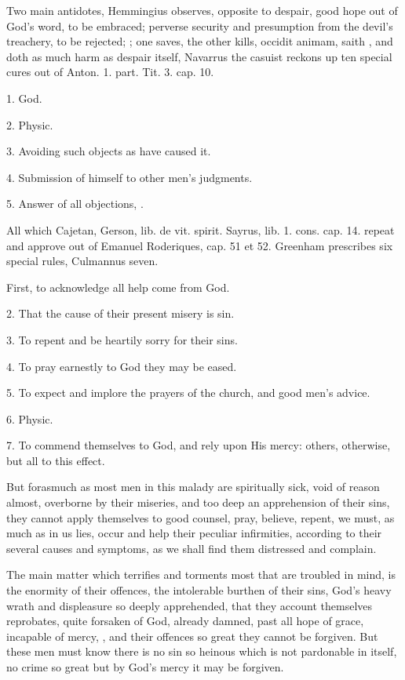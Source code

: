 {Two main antidotes, Hemmingius observes, opposite to despair,
good hope out of God's word, to be embraced; perverse security and
presumption from the devil's treachery, to be rejected; ; one saves, the other kills, occidit animam, saith
\Austin{}, and doth as much harm as despair itself, Navarrus the
casuist reckons up ten special cures out of Anton. \textlatin{1. part. Tit. 3.
cap. 10.}

1. God.

2. Physic.

3. Avoiding such objects as have
caused it.

4. Submission of himself to other men's judgments.

5. Answer of all objections, \etc{}.

All which Cajetan, Gerson, \textlatin{lib. de vit. spirit.}
Sayrus, \textlatin{lib. 1. cons. cap. 14.} repeat and approve out of Emanuel
Roderiques, \textlatin{cap. 51 et 52.} Greenham prescribes six special rules,
Culmannus seven.

First, to acknowledge all help come from God.

2. That the cause of their present misery is sin.

3. To repent and be heartily sorry for their sins.

4. To pray earnestly to God they may be eased.

5. To expect and implore the prayers of the church, and good men's advice.

6. Physic.

7. To commend themselves to God, and rely upon His mercy: others, otherwise, but all to this effect.

But forasmuch as most men in
this malady are spiritually sick, void of reason almost, overborne by
their miseries, and too deep an apprehension of their sins, they cannot
apply themselves to good counsel, pray, believe, repent, we must, as
much as in us lies, occur and help their peculiar infirmities,
according to their several causes and symptoms, as we shall find them
distressed and complain.

The main matter which terrifies and torments most that are troubled in
mind, is the enormity of their offences, the intolerable burthen of
their sins, God's heavy wrath and displeasure so deeply apprehended,
that they account themselves reprobates, quite forsaken of God, already
damned, past all hope of grace, incapable of mercy, ,
and their offences so great they cannot be forgiven. But
these men must know there is no sin so heinous which is not pardonable
in itself, no crime so great but by God's mercy it may be forgiven.

}

